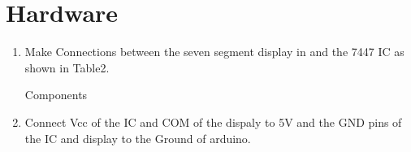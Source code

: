 \documentclass{article}
\begin{document}
\section{Hardware}
		\begin{enumerate}
			\item Make Connections between the seven segment display in and the 7447 IC as shown in Table2.


\begin{table}[h]
\centering

\caption{Components}
\label{table:Components}
\end{table}
			\item Connect Vcc of the IC and COM of the dispaly to 5V and the GND pins of the IC and display to the Ground of arduino.
		\end{enumerate}
\end{document}

